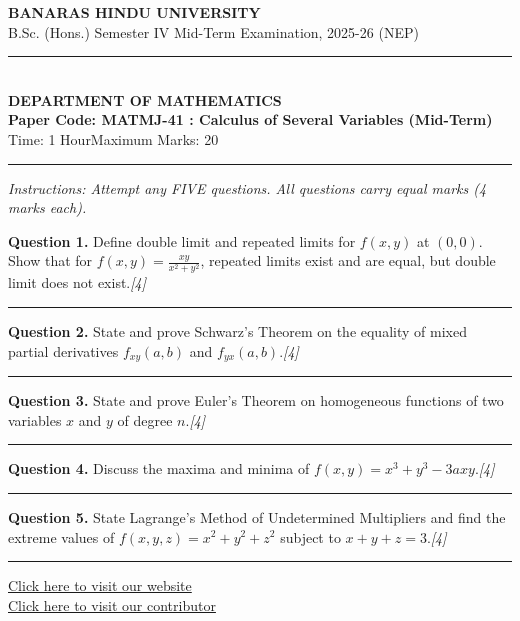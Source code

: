 \documentclass[11pt,a4paper]{article}
\newcommand{\pts}[1]{\hfill   \textit{[#1]}}
\begin{document}
\begin{center}
  {\large\bfseries BANARAS HINDU UNIVERSITY}\\[2pt]
  {\normalsize B.Sc. (Hons.) Semester IV Mid-Term Examination, 2025-26 (NEP)}\\[6pt]
  \rule{0.8\linewidth}{0.5pt}\\[6pt]
  {\large\bfseries DEPARTMENT OF MATHEMATICS}\\[4pt]
  {\large\bfseries Paper Code: MATMJ-41 : Calculus of Several Variables (Mid-Term)}\\[4pt]
  {\normalsize Time: 1 Hour\hfill Maximum Marks: 20}
\end{center}

\rule{\linewidth}{0.4pt}

\smallskip



\noindent   \textit{Instructions: Attempt any FIVE questions. All questions carry equal marks (4 marks each).}

\bigskip




\noindent   \textbf{Question 1.} Define double limit and repeated limits for $f(x, y)$ at $(0, 0)$. Show that for $f(x, y) = \frac{xy}{x^2 + y^2}$, repeated limits exist and are equal, but double limit does not exist.\pts{4}

\medskip\rule{\linewidth}{0.2pt}\medskip




\noindent   \textbf{Question 2.} State and prove Schwarz's Theorem on the equality of mixed partial derivatives $f_{xy}(a, b)$ and $f_{yx}(a, b)$.\pts{4}

\medskip\rule{\linewidth}{0.2pt}\medskip




\noindent   \textbf{Question 3.} State and prove Euler's Theorem on homogeneous functions of two variables $x$ and $y$ of degree $n$.\pts{4}

\medskip\rule{\linewidth}{0.2pt}\medskip




\noindent   \textbf{Question 4.} Discuss the maxima and minima of $f(x, y) = x^3 + y^3 - 3axy$.\pts{4}

\medskip\rule{\linewidth}{0.2pt}\medskip




\noindent   \textbf{Question 5.} State Lagrange's Method of Undetermined Multipliers and find the extreme values of $f(x, y, z) = x^2 + y^2 + z^2$ subject to $x + y + z = 3$.\pts{4}

\vfill
\rule{\linewidth}{0.4pt}

\begin{center}\small
\href{https://bhu-exam.vercel.app/}{Click here to visit our website}\\[4pt]
\href{https://me-aryan.vercel.app/}{Click here to visit our contributor}
\end{center}
\end{document}
